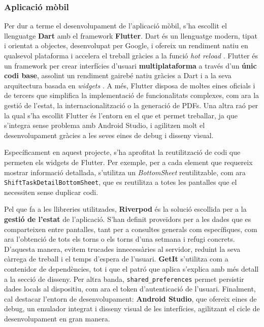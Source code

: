 \documentclass[11pt,a4paper]{report}
\begin{document}
\subsubsection{Aplicació mòbil}
Per dur a terme el desenvolupament de l'aplicació mòbil, s'ha escollit el llenguatge \textbf{Dart} amb el framework \textbf{Flutter}. Dart és un llenguatge modern, tipat i orientat a objectes, desenvolupat per Google, i ofereix un rendiment natiu en qualsevol plataforma i accelera el treball gràcies a la funció \textit{hot reload} \cite{noauthor_hot_nodate}. Flutter és un framework per crear interfícies d'usuari \textbf{multiplataforma} a través d'un \textbf{únic codi base}, assolint un rendiment gairebé natiu gràcies a Dart \cite{nirala_flutter_2025} i a la seva arquitectura basada en \textit{widgets} \cite{noauthor_flutter_nodate}. A més, Flutter disposa de moltes eines oficials i de tercers que simplifica la implementació de funcionalitats complexes, com ara la gestió de l'estat, la internacionalització o la generació de PDFs. Una altra raó per la qual s'ha escollit Flutter és l'entorn en el que et permet treballar, ja que s'integra sense problema amb Android Studio, i agilitzen molt el desenvolupament gràcies a les seves eines de debug i disseny visual.

Específicament en aquest projecte, s'ha aprofitat la reutilització de codi que permeten els widgets de Flutter. Per exemple, per a cada element que requereix mostrar informació detallada, s'utilitza un \textit{BottomSheet} reutilitzable, com ara \texttt{ShiftTaskDetailBottomSheet}, que es reutilitza a totes les pantalles que el necessiten sense duplicar codi.

Pel que fa a les llibreries utilitzades, \textbf{Riverpod} \cite{noauthor_riverpod_nodate} és la solució escollida per a la \textbf{gestió de l'estat} de l'aplicació. S'han definit proveïdors per a les dades que es comparteixen entre pantalles, tant per a consultes generals com específiques, com ara l'obtenció de tots els torns o els torns d'una setmana i refugi concrets. D'aquesta manera, evitem trucades innecessàries al servidor, reduint la seva càrrega de treball i el temps d'espera de l'usuari. \textbf{GetIt} \cite{noauthor_get_it_nodate} s'utilitza com a contenidor de dependències, tot i que el patró que aplica s'explica amb més detall a la secció de disseny. Per altra banda, \texttt{shared\_preferences} \cite{noauthor_shared_preferences_nodate} permet persistir dades locals al dispositiu, com ara el token d'autenticació de l'usuari.
Finalment, cal destacar l'entorn de desenvolupament: \textbf{Android Studio}, que ofereix eines de debug, un emulador integrat i disseny visual de les interfícies, agilitzant el cicle de desenvolupament en gran manera.
\end{document}
